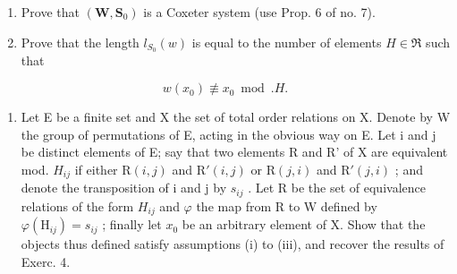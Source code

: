 \begin{enumerate}
\def\labelenumi{\alph{enumi})}
\item
  Prove that \((\mathbf{W},\mathbf{S}_0)\) is a Coxeter system (use Prop. 6 of no. 7).
\item
  Prove that the length \(l_{S_0}(w)\) is equal to the number of elements \(H \in \mathfrak{R}\) such that
\end{enumerate}

\[
w (x _ {0}) \not \equiv x _ {0} \bmod . H.
\]

\begin{enumerate}
\def\labelenumi{\alph{enumi})}
\setcounter{enumi}{2}
\tightlist
\item
  Let E be a finite set and X the set of total order relations on X. Denote by W the group of permutations of E, acting in the obvious way on E. Let i and j be distinct elements of E; say that two elements R and R' of X are equivalent mod. \(H_{ij}\) if either \(\mathrm{R}(i,j)\) and \(\mathrm{R}'(i,j)\) or \(\mathrm{R}(j,i)\) and \(\mathrm{R}'(j,i)\) ; and denote the transposition of i and j by \(s_{ij}\) . Let R be the set of equivalence relations of the form \(H_{ij}\) and \(\varphi\) the map from R to W defined by \(\varphi(\mathrm{H}_{ij}) = s_{ij}\) ; finally let \(x_{0}\) be an arbitrary element of X. Show that the objects thus defined satisfy assumptions (i) to (iii), and recover the results of Exerc. 4.
\end{enumerate}

